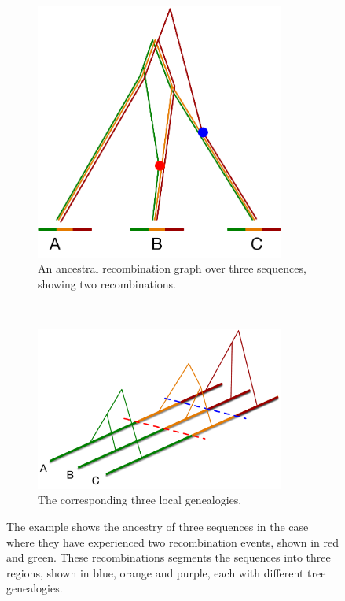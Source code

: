 \begin{figure}
 \center
    \begin{subfigure}[t]{0.41\textwidth}
        \centering
        \includegraphics[width={0.9\textwidth}]{Chapters/Sequential-coalescent-figures/ARG}
        \caption{An ancestral recombination graph over three sequences, showing two recombinations.}
    \end{subfigure}%
    ~ 
    \begin{subfigure}[t]{0.55\textwidth}
        \centering
        \includegraphics[width={0.9\textwidth}]{Chapters/Sequential-coalescent-figures/Local-genealogies}
        \caption{The corresponding three local genealogies.}
    \end{subfigure}%
  \caption{The example shows the ancestry of three sequences in the case where they have experienced two recombination events, shown in red and green. These recombinations segments the sequences into three regions, shown in blue, orange and purple, each with different tree genealogies.}
  \label{fig:ARG-and-local-genealogies}
\end{figure}

